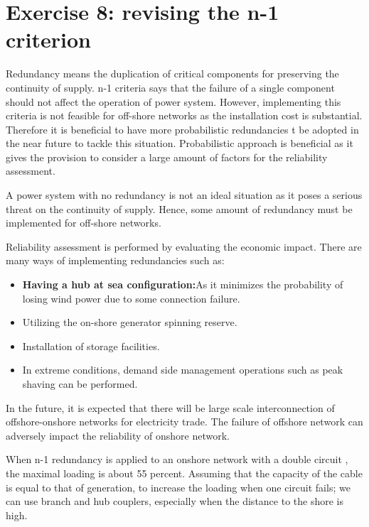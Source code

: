 \section*{\textbf{Exercise 8: revising the n-1 criterion}}

Redundancy means the duplication of critical components for preserving the continuity of supply. n-1 criteria says that the failure of a single component should not affect the operation of power system. However, implementing this criteria is not feasible for off-shore networks as the installation cost is substantial. Therefore it is beneficial to have more probabilistic redundancies t be adopted in the near future to tackle this situation.
Probabilistic approach is beneficial as it gives the provision to consider a large amount of factors for the reliability assessment. 

A power system with no redundancy is not an ideal situation as it poses a serious threat on the continuity of supply. Hence, some amount of redundancy must be implemented for off-shore networks. 

Reliability assessment is performed by evaluating the economic impact. There are many ways of implementing redundancies such as:
\begin{itemize}
    \item \textbf{Having a hub at sea configuration:}As it minimizes the probability of losing wind power due to some connection failure.
    \item Utilizing the on-shore generator spinning reserve.
    \item Installation of storage facilities.
    \item In extreme conditions, demand side management operations such as peak shaving can be performed.
  \end{itemize}
  
In the future, it is expected that there will  be large scale interconnection of offshore-onshore  networks for electricity trade. The failure of offshore network can adversely impact the reliability of onshore network.

When n-1 redundancy is applied to an onshore network with a double circuit , the maximal loading is about 55 percent. Assuming that the capacity of the cable is equal to that of generation, to increase the loading when one circuit fails; we can use  branch and hub couplers, especially when the distance to the shore is high.